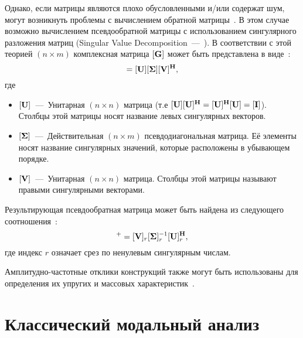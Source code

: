 Однако, если матрицы являются плохо обусловленными и/или содержат шум, могут возникнуть проблемы с вычислением обратной матрицы~\cite{lib:coupling:Gialamas2001}. В этом случае возможно вычислением псевдообратной матрицы с использованием сингулярного разложения матриц (Singular Value Decomposition~---~). В соответствии с этой теорией $ (n \times m) $ комплексная матрица $ [\mathbf{G}] $ может быть представлена в виде~\cite{lib:coupling:Gialamas2001}:
\begin{equation}
	[\mat{G}] = [\mat{U}][\mat{\Sigma}][\mat{V}] ^ \mat{H},
\end{equation}
где 
\begin{itemize}
	\item $ [\mathbf{U}] $~---~Унитарная $(n \times n)$ матрица (т.е $ [\mathbf{U}][\mathbf{U}] ^ {\mathbf{H}} = [\mathbf{U}] ^ {\mathbf{H}}[\mathbf{U}] = [\mathbf{I}] $). Столбцы этой матрицы носят название левых сингулярных векторов.
	\item $[\mathbf{\Sigma}]$~---~Действительная $(n \times m)$ псевдодиагональная матрица. Её элементы носят название сингулярных значений, которые расположены в убывающем порядке.
	\item $[\mathbf{V}]$~---~Унитарная ${(n \times n)}$ матрица. Столбцы этой матрицы называют правыми сингулярными векторами. 
\end{itemize}

Результирующая псевдообратная матрица может быть найдена из следующего соотношения~\cite{lib:coupling:Gialamas2001}:
\begin{equation}
	[\mat{G}]^{+} = [\mat{V}]_r [\mat{\Sigma}]_r ^ {-1} [\mat{U}]_r ^ \mat{H},
\end{equation}
где индекс $ r $ означает срез по ненулевым сингулярным числам.

Амплитудно-частотные отклики конструкций также могут быть использованы для определения их упругих и массовых характеристик~\cite{lib:coupling:Almeida, lib:coupling:Xi, lib:coupling:Malekjafarian}.

\section{Классический модальный анализ}

